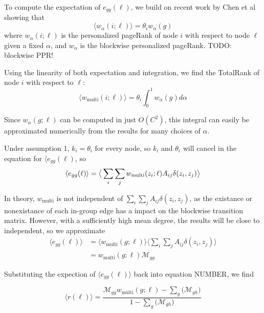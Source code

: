 \documentclass[12pt]{article}
\begin{document}
To compute the expectation of $e_{gg}(\ell)$, we build on recent work by Chen et al \cite{chen:2020} showing that
\begin{equation}
  \langle w_\alpha (i ; \ell) \rangle = \theta_i w_\alpha(g)
\end{equation}
where $w_\alpha(i;\ell)$ is the personalized pageRank of node $i$ with respect to node $\ell$ given a fixed $\alpha$, and $w_\alpha$ is the blockwise personalized pageRank.
TODO: blockwise PPR! 

Using the linearity of both expectation and integration, we find the TotalRank \cite{boldi:2005} \cite{Peel:2018} of node $i$ with respect to $\ell$:
\begin{equation}
  \langle w_\text{multi} (i ; \ell) \rangle = \theta_i \int_0^1 w_\alpha(g) d\alpha
\end{equation}

Since $w_\alpha (g;\ell)$ can be computed in just $O(C^2)$, this integral can easily be approximated numerically from the results for many choices of $\alpha$.

Under assumption 1, $k_i = \theta_i$ for every node, so $k_i$ and $\theta_i$ will cancel in the equation for $\langle e_{gg} (\ell)$, so
\begin{equation}
    \langle e_{gg}(\ell) \rangle = \big \langle \sum_i \sum_j w_\text{multi}(z_i; \ell) A_{ij} \delta(z_i, z_j) \big \rangle\\
\end{equation}

In theory, $w_\text{multi}$ is not independent of $\sum_i \sum_j A_{ij} \delta(z_i, z_j)$, as the existance or nonexistance of each in-group edge has a impact on the blockwise transition matrix.  However, with a sufficiently high mean degree, the results will be close to independent, so we approximate
\begin{equation}
  \begin{aligned}
    \langle e_{gg}(\ell) \rangle &= \big \langle w_\text{multi}(g; \ell) \big \rangle \big \langle \sum_i \sum_j A_{ij} \delta(z_i, z_j) \big \rangle \\
    &= w_\text{multi}(g; \ell) \mathcal{M}_{gg}
  \end{aligned}
\end{equation}

Substituting the expection of $\langle e_{gg}(\ell)\rangle$ back into equation NUMBER, we find

\begin{equation}
  \langle r(\ell) \rangle = \frac{\mathcal{M}_{gg} w_\text{multi}(g; \ell) - \sum_g \big( \mathcal{M}_{gh} \big)}{1 - \sum_g \big( \mathcal{M}_{gh} \big)}
\end{equation}
\end{document}
